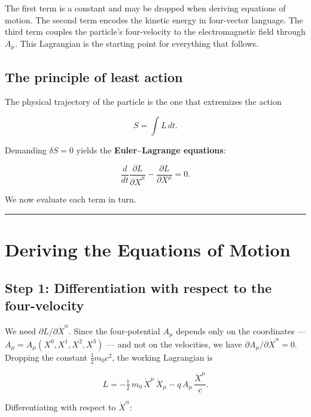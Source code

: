 The first term is a constant and may be dropped when deriving equations of motion. The second term encodes the kinetic energy in four-vector language. The third term couples the particle's four-velocity to the electromagnetic field through $A_\mu$. This Lagrangian is the starting point for everything that follows.

\subsection*{The principle of least action}

The physical trajectory of the particle is the one that extremizes the action

\begin{equation}
S = \int L\,dt.
\end{equation}

Demanding $\delta S = 0$ yields the \textbf{Euler--Lagrange equations}:

\begin{equation}
\frac{d}{dt}\frac{\partial L}{\partial \dot{X}^\mu} - \frac{\partial L}{\partial X^\mu} = 0.
\end{equation}

We now evaluate each term in turn.

\hrule
\vspace{1em}

\section{Deriving the Equations of Motion}

\subsection*{Step 1: Differentiation with respect to the four-velocity}

We need $\partial L / \partial \dot{X}^\alpha$. Since the four-potential $A_\mu$ depends only on the coordinates --- $A_\mu = A_\mu(X^0, X^1, X^2, X^3)$ --- and not on the velocities, we have $\partial A_\mu / \partial \dot{X}^\alpha = 0$. Dropping the constant $\tfrac{1}{2}m_0 c^2$, the working Lagrangian is

\begin{equation}
L = -\tfrac{1}{2}\,m_0\,\dot{X}^\mu\,\dot{X}_\mu - q\,A_\mu\,\frac{\dot{X}^\mu}{c}.
\end{equation}

Differentiating with respect to $\dot{X}^\alpha$:

